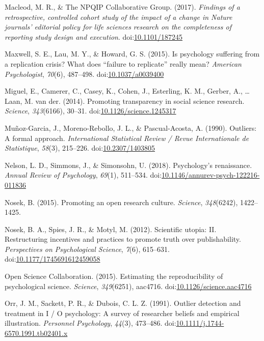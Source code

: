 \documentclass[english,,man,mask]{apa6}
\theoremstyle{definition}
\theoremstyle{definition}
\theoremstyle{definition}
\theoremstyle{remark}
\begin{document}
\hypertarget{ref-Macleod2017}{}
Macleod, M. R., \& The NPQIP Collaborative Group. (2017). \emph{Findings
of a retrospective, controlled cohort study of the impact of a change in
Nature journals' editorial policy for life sciences research on the
completeness of reporting study design and execution}.
doi:\href{https://doi.org/10.1101/187245}{10.1101/187245}

\hypertarget{ref-Maxwell2015}{}
Maxwell, S. E., Lau, M. Y., \& Howard, G. S. (2015). Is psychology
suffering from a replication crisis? What does ``failure to replicate''
really mean? \emph{American Psychologist}, \emph{70}(6), 487--498.
doi:\href{https://doi.org/10.1037/a0039400}{10.1037/a0039400}

\hypertarget{ref-Miguel2014}{}
Miguel, E., Camerer, C., Casey, K., Cohen, J., Esterling, K. M., Gerber,
A., \ldots{} Laan, M. van der. (2014). Promoting transparency in social
science research. \emph{Science}, \emph{343}(6166), 30--31.
doi:\href{https://doi.org/10.1126/science.1245317}{10.1126/science.1245317}

\hypertarget{ref-Munoz-Garcia1990}{}
Muñoz-Garcia, J., Moreno-Rebollo, J. L., \& Pascual-Acosta, A. (1990).
Outliers: A formal approach. \emph{International Statistical Review /
Revue Internationale de Statistique}, \emph{58}(3), 215--226.
doi:\href{https://doi.org/10.2307/1403805}{10.2307/1403805}

\hypertarget{ref-Nelson2018}{}
Nelson, L. D., Simmons, J., \& Simonsohn, U. (2018). Psychology's
renaissance. \emph{Annual Review of Psychology}, \emph{69}(1), 511--534.
doi:\href{https://doi.org/10.1146/annurev-psych-122216-011836}{10.1146/annurev-psych-122216-011836}

\hypertarget{ref-Nosek2015b}{}
Nosek, B. (2015). Promoting an open research culture. \emph{Science},
\emph{348}(6242), 1422--1425.

\hypertarget{ref-Nosek2012c}{}
Nosek, B. A., Spies, J. R., \& Motyl, M. (2012). Scientific utopia: II.
Restructuring incentives and practices to promote truth over
publishability. \emph{Perspectives on Psychological Science},
\emph{7}(6), 615--631.
doi:\href{https://doi.org/10.1177/1745691612459058}{10.1177/1745691612459058}

\hypertarget{ref-ScienceCollaboration2015}{}
Open Science Collaboration. (2015). Estimating the reproducibility of
psychological science. \emph{Science}, \emph{349}(6251), aac4716.
doi:\href{https://doi.org/10.1126/science.aac4716}{10.1126/science.aac4716}

\hypertarget{ref-Orr1991}{}
Orr, J. M., Sackett, P. R., \& Dubois, C. L. Z. (1991). Outlier
detection and treatment in I / O psychology: A survey of researcher
beliefs and empirical illustration. \emph{Personnel Psychology},
\emph{44}(3), 473--486.
doi:\href{https://doi.org/10.1111/j.1744-6570.1991.tb02401.x}{10.1111/j.1744-6570.1991.tb02401.x}
\end{document}
